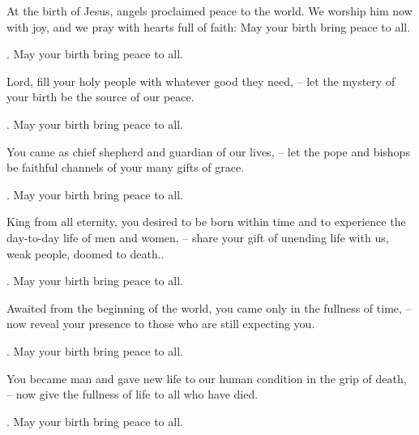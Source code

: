 \lettrine[loversize=0.15,lines=2]{A}{}t the birth of Jesus, angels proclaimed peace to the world. We worship him now with joy, and we pray with hearts full of faith: May your birth bring peace to all.
\par \Rbar. May your birth bring peace to all.

Lord, fill your holy people with whatever good they need,
– let the mystery of your birth be the source of our peace.
\par \Rbar. May your birth bring peace to all.

You came as chief shepherd and guardian of our lives,
– let the pope and bishops be faithful channels of your many gifts of grace.
\par \Rbar. May your birth bring peace to all.

King from all eternity, you desired to be born within time and to experience the day-to-day life of men and women,
– share your gift of unending life with us, weak people, doomed to death..
\par \Rbar. May your birth bring peace to all.

Awaited from the beginning of the world, you came only in the fullness of time,
– now reveal your presence to those who are still expecting you.
\par \Rbar. May your birth bring peace to all.

You became man and gave new life to our human condition in the grip of death,
– now give the fullness of life to all who have died.
\par \Rbar. May your birth bring peace to all.